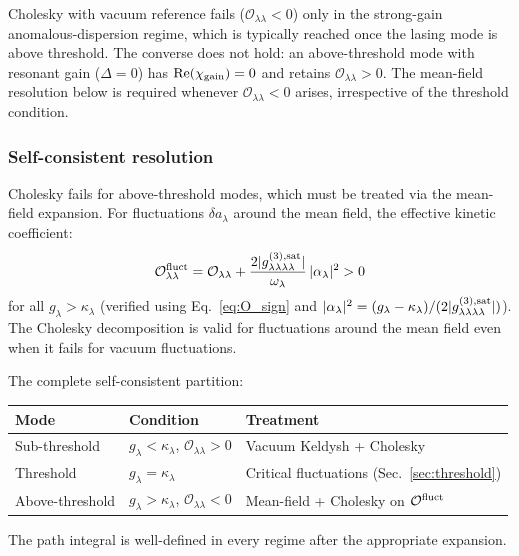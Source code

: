 \documentclass[12pt]{article}
\begin{document}
\begin{remark}
Cholesky with vacuum reference fails ($\mathcal{O}_{\lambda\lambda}<0$)
only in the strong-gain anomalous-dispersion regime, which is typically
reached once the lasing mode is above threshold.  The converse does not
hold: an above-threshold mode with resonant gain ($\Delta=0$) has
$\mathrm{Re}(\chi_{\rm gain})=0$ and retains
$\mathcal{O}_{\lambda\lambda}>0$.  The mean-field resolution below is
required whenever $\mathcal{O}_{\lambda\lambda}<0$ arises, irrespective
of the threshold condition.
\end{remark}

\subsubsection*{Self-consistent resolution}

Cholesky fails for above-threshold modes, which must be treated via
the mean-field expansion.  For fluctuations $\delta a_\lambda$ around
the mean field, the effective kinetic coefficient:
\begin{equation}
  \mathcal{O}^{\rm fluct}_{\lambda\lambda} =
  \mathcal{O}_{\lambda\lambda}
  + \frac{2|g^{(3),\rm sat}_{\lambda\lambda\lambda\lambda}|}
  {\omega_\lambda}\,|\alpha_\lambda|^2 > 0
  \label{eq:O_fluct}
\end{equation}
for all $g_\lambda>\kappa_\lambda$ (verified using Eq.~\ref{eq:O_sign}
and $|\alpha_\lambda|^2=(g_\lambda-\kappa_\lambda)/
(2|g^{(3),\rm sat}_{\lambda\lambda\lambda\lambda}|)$).
The Cholesky decomposition is valid for fluctuations around the mean
field even when it fails for vacuum fluctuations.

The complete self-consistent partition:
\begin{center}
\begin{tabular}{lll}
\toprule
Mode & Condition & Treatment \\
\midrule
Sub-threshold & $g_\lambda<\kappa_\lambda$,
  $\mathcal{O}_{\lambda\lambda}>0$ &
  Vacuum Keldysh + Cholesky \\
Threshold & $g_\lambda=\kappa_\lambda$ &
  Critical fluctuations (Sec.~\ref{sec:threshold}) \\
Above-threshold & $g_\lambda>\kappa_\lambda$,
  $\mathcal{O}_{\lambda\lambda}<0$ &
  Mean-field + Cholesky on $\mathcal{O}^{\rm fluct}$ \\
\bottomrule
\end{tabular}
\end{center}
The path integral is well-defined in every regime after the
appropriate expansion.
\end{document}
